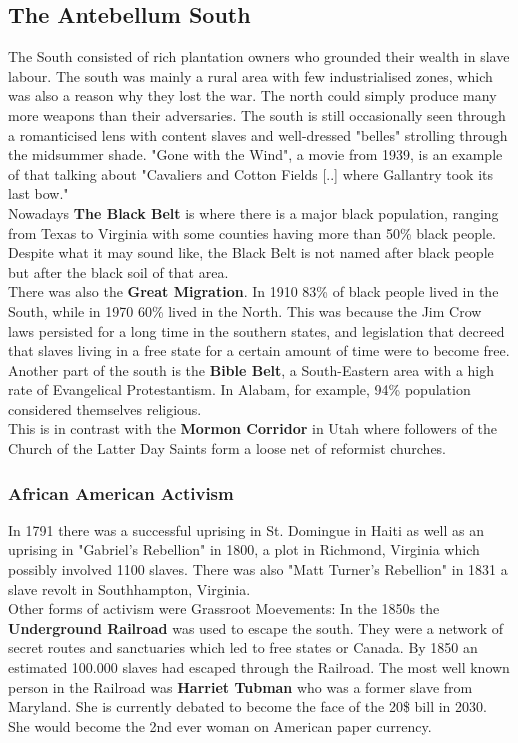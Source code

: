 \documentclass{article}
\begin{document}
	\subsection{The Antebellum South}
	The South consisted of rich plantation owners who grounded their wealth in slave labour. The south was mainly a rural area with few industrialised zones, which was also a reason why they lost the war. The north could simply produce many more weapons than their adversaries. The south is still occasionally seen through a romanticised lens with content slaves and well-dressed "belles" strolling through the midsummer shade. "Gone with the Wind", a movie from 1939, is an example of that talking about "Cavaliers and Cotton Fields [..] where Gallantry took its last bow." \\
	Nowadays \textbf{The Black Belt} is where there is a major black population, ranging from Texas to Virginia with some counties having more than 50\% black people. Despite what it may sound like, the Black Belt is not named after black people but after the black soil of that area. \\
	There was also the \textbf{Great Migration}. In 1910 83\% of black people lived in the South, while in 1970 60\% lived in the North. This was because the Jim Crow laws persisted for a long time in the southern states, and legislation that decreed that slaves living in a free state for a certain amount of time were to become free. \\
	Another part of the south is the \textbf{Bible Belt}, a South-Eastern area with a high rate of Evangelical Protestantism. In Alabam, for example, 94\% population considered themselves religious.\\
	This is in contrast with the \textbf{Mormon Corridor} in Utah where followers of the Church of the Latter Day Saints form a loose net of reformist churches. \\
	\subsubsection{African American Activism}
	In 1791 there was a successful uprising in St. Domingue in Haiti as well as an uprising in "Gabriel's Rebellion" in 1800, a plot in Richmond, Virginia which possibly involved 1100 slaves. There was also "Matt Turner's Rebellion" in 1831 a slave revolt in Southhampton, Virginia. \\
	Other forms of activism were Grassroot Moevements: In the 1850s the \textbf{Underground Railroad} was used to escape the south. They were a network of secret routes and sanctuaries which led to free states or Canada. By 1850 an estimated 100.000 slaves had escaped through the Railroad. The most well known person in the Railroad was \textbf{Harriet Tubman} who was a former slave from Maryland. She is currently debated to become the face of the 20\$ bill in 2030. She would become the 2nd ever woman on American paper currency. \\
\end{document}
